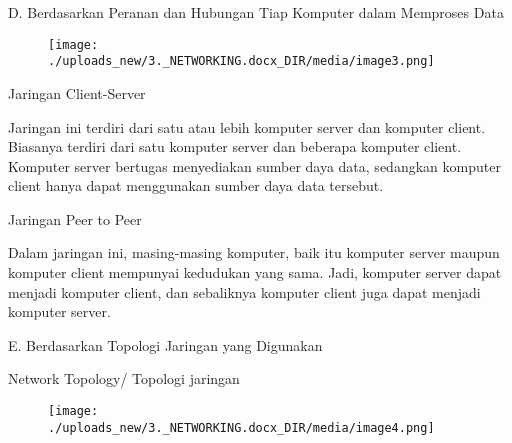 \documentclass[a4paper,12pt]{report}
\begin{document}
\vspace{12pt}
\noindent 
D. Berdasarkan Peranan dan Hubungan Tiap Komputer dalam Memproses Data \par
\noindent 
\begin{center}



\begin{figure}[H]
\begin{center}
\texttt{[image: ./uploads\_new/3.\_NETWORKING.docx\_DIR/media/image3.png]}
\end{center}
\end{figure}




\end{center}\vspace{12pt}
\noindent 
\begin{myEnumerate}
\item Jaringan Client-Server \par
Jaringan ini terdiri dari satu atau lebih komputer server dan komputer client. Biasanya terdiri dari satu komputer server dan beberapa komputer client. Komputer server bertugas menyediakan sumber daya data, sedangkan komputer client hanya dapat menggunakan sumber daya data tersebut. \par
\vspace{12pt}
\noindent 
\item Jaringan Peer to Peer\end{myEnumerate}
 \par
Dalam jaringan ini, masing-masing komputer, baik itu komputer server maupun komputer client mempunyai kedudukan yang sama. Jadi, komputer server dapat menjadi komputer client, dan sebaliknya komputer client juga dapat menjadi komputer server. \par
\vspace{12pt}
\noindent 
E. Berdasarkan Topologi Jaringan yang Digunakan \par
\noindent 
Network Topology/ Topologi jaringan \par
\noindent 
\begin{center}



\begin{figure}[H]
\begin{center}
\texttt{[image: ./uploads\_new/3.\_NETWORKING.docx\_DIR/media/image4.png]}
\end{center}
\end{figure}




\end{center}\vspace{12pt}
\end{document}
